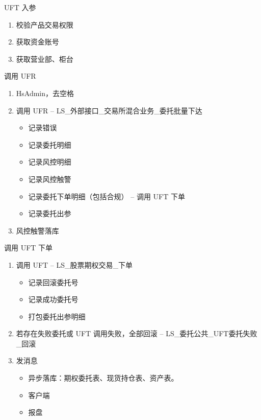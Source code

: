 \documentclass[12pt]{ctexbeamer}	%
\begin{document}
\begin{frame}{UFT 入参}
  \begin{enumerate}
    \item 校验产品交易权限
    \item 获取资金账号
    \item 获取营业部、柜台
  \end{enumerate}
\end{frame}

\begin{frame}{调用 UFR}
  \begin{enumerate}
    \item HsAdmin，去空格
    \item 调用 UFR -- LS\_外部接口\_交易所混合业务\_委托批量下达
    \begin{itemize}
      \item 记录错误
      \item 记录委托明细
      \item 记录风控明细
      \item 记录风控触警
      \item 记录委托下单明细（包括合规） -- 调用 UFT 下单
      \item 记录委托出参
    \end{itemize}
  \item 风控触警落库
  \end{enumerate}
\end{frame}

\begin{frame}{调用 UFT 下单}
  \begin{enumerate}
    \item 调用 UFT -- LS\_股票期权交易\_下单
    \begin{itemize}
      \item 记录回滚委托号
      \item 记录成功委托号
      \item 打包委托出参明细
    \end{itemize}
    \item 若存在失败委托或 UFT 调用失败，全部回滚 -- LS\_委托公共\_UFT委托失败\_回滚
    \item 发消息
    \begin{itemize}
      \item 异步落库：期权委托表、现货持仓表、资产表。
      \item 客户端
      \item 报盘
    \end{itemize}
  \end{enumerate}
\end{frame}
\end{document}
